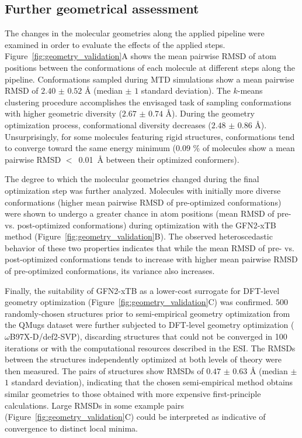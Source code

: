 \subsection*{Further geometrical assessment}

The changes in the molecular geometries along the applied pipeline were examined in order to evaluate the effects of the applied steps. Figure~\ref{fig:geometry_validation}A shows the mean pairwise RMSD of atom positions between the conformations of each molecule at different steps along the pipeline. Conformations sampled during MTD simulations show a mean pairwise RMSD of $2.40$ $\pm$ $0.52$ \si{\angstrom} (median $\pm$ $1$ standard deviation). The $k$-means clustering procedure accomplishes the envisaged task of sampling conformations with higher geometric diversity ($2.67$ $\pm$ $0.74$ \si{\angstrom}). During the geometry optimization process, conformational diversity decreases ($2.48$ $\pm$ $0.86$ \si{\angstrom}). Unsurprisingly, for some molecules featuring rigid structures, conformations tend to converge toward the same energy minimum ($0.09$ \% of molecules show a mean pairwise RMSD $<$~\SI{0.01}{\angstrom} between their optimized conformers).


The degree to which the molecular geometries changed during the final optimization step was further analyzed. Molecules with initially more diverse conformations (higher mean pairwise RMSD of pre-optimized conformations) were shown to undergo a greater chance in atom positions (mean RMSD of pre- vs. post-optimized conformations) during optimization with the GFN2-xTB method (Figure~\ref{fig:geometry_validation}B). The observed heteroscedastic behavior of these two properties indicates that while the mean RMSD of pre- vs. post-optimized conformations tends to increase with higher mean pairwise RMSD of pre-optimized conformations, its variance also increases. 


Finally, the suitability of GFN2-xTB as a lower-cost surrogate for DFT-level geometry optimization (Figure~\ref{fig:geometry_validation}C) was confirmed. $500$ randomly-chosen structures prior to semi-empirical geometry optimization from the QMugs dataset were further subjected to DFT-level geometry optimization ($\omega$B97X-D/def2-SVP), discarding structures that could not be converged in 100 iterations or with the computational resources described in the ESI. The RMSDs between the structures independently optimized at both levels of theory were then measured. The pairs of structures show RMSDs of $0.47$ $\pm$ $0.63$ \si{\angstrom} (median $\pm$ $1$ standard deviation), indicating that the chosen semi-empirical method obtains similar geometries to those obtained with more expensive first-principle calculations. Large RMSDs in some example pairs (Figure~\ref{fig:geometry_validation}C) could be interpreted as indicative of convergence to distinct local minima. 

